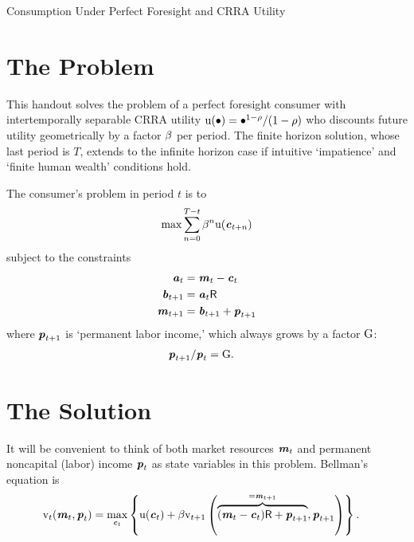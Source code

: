 \documentclass{scrartcl}
\begin{document}
\handoutHeader

{\centerline {\LARGE Consumption Under Perfect Foresight and CRRA Utility }}\vspace{0.15in}


\section{The Problem}

This handout solves the problem of a perfect foresight consumer with intertemporally separable CRRA utility
$\mathrm{u}(\bullet)= \bullet^{1-\rho}/(1-\rho)$ who discounts future utility
geometrically by a factor $\beta$ per period.  The finite horizon
solution, whose last period is $T$, extends to the infinite horizon case if 
intuitive `impatience' and `finite human wealth' conditions hold.

The consumer's problem in period $t$ is to
\begin{equation}
\max \sum_{n=0}^{T-t} \beta^{n} \mathrm{u}(\boldsymbol{\mathit{c}}_{t+n})                \label{eq:maxprob}
\end{equation}
subject to the constraints 
\begin{equation}\begin{gathered}\begin{aligned}
      \boldsymbol{\mathit{a}}_{t}   & =  \boldsymbol{\mathit{m}}_{t}-\boldsymbol{\mathit{c}}_{t}
\\    \boldsymbol{\mathit{b}}_{t+1} & =  \boldsymbol{\mathit{a}}_{t}\mathsf{R}
\\    \boldsymbol{\mathit{m}}_{t+1} & =  \boldsymbol{\mathit{b}}_{t+1}+\boldsymbol{\mathit{p}}_{t+1}
\end{aligned}\end{gathered}\end{equation}
where $\boldsymbol{\mathit{p}}_{t+1}$ is `permanent labor income,' which always grows by a factor $\mathrm{G}$:
\begin{equation}\begin{gathered}\begin{aligned}
        \boldsymbol{\mathit{p}}_{t+1}/\boldsymbol{\mathit{p}}_{t} & =  {\mathrm{G}}.
\end{aligned}\end{gathered}\end{equation}

\section{The Solution}

It will be convenient to think of both market resources $\boldsymbol{\mathit{m}}_{t}$ and permanent noncapital (labor) income $\boldsymbol{\mathit{p}}_{t}$ 
as state variables in this problem.
Bellman's equation is 
\begin{equation}\begin{gathered}\begin{aligned}
        \mathrm{v}_{t}(\boldsymbol{\mathit{m}}_{t},\boldsymbol{\mathit{p}}_{t}) & =  \max_{\boldsymbol{\mathit{c}}_{t}} \left\{ \mathrm{u}(\boldsymbol{\mathit{c}}_{t}) + \beta \mathrm{v}_{t+1}\left(\overbrace{(\boldsymbol{\mathit{m}}_{t}-\boldsymbol{\mathit{c}}_{t})\mathsf{R}+\boldsymbol{\mathit{p}}_{t+1}}^{=\boldsymbol{\mathit{m}}_{t+1}},\boldsymbol{\mathit{p}}_{t+1}\right)\right\}.
        \label{eq:vmax}
\end{aligned}\end{gathered}\end{equation}
\end{document}
